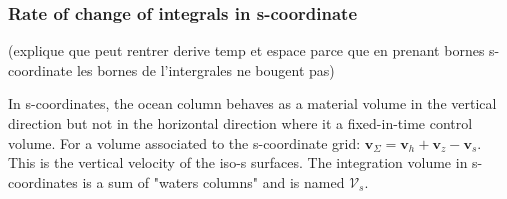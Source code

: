 \subsubsection{Rate of change of integrals in s-coordinate}

(explique que peut rentrer derive temp et espace parce que en prenant bornes s-coordinate les bornes de l'intergrales ne bougent pas)


In s-coordinates, the ocean column behaves as a material volume in the vertical direction but not in the horizontal direction where it a fixed-in-time control volume. For a volume associated to the s-coordinate grid: $  \mathbf{v}_{\Sigma}=\mathbf{v}_h+\mathbf{v}_z-\mathbf{v}_s$. This is the vertical velocity of the iso-s surfaces. The integration volume in s-coordinates is a sum of "waters columns" and is named $\mathcal{V}_s$. \\

